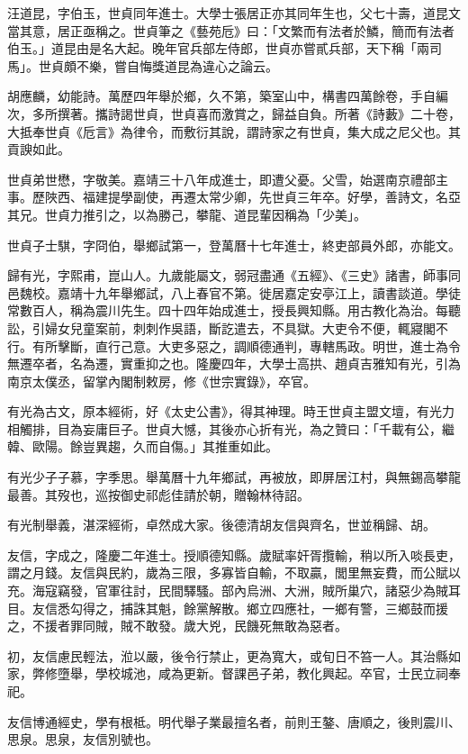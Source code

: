 \begin{pinyinscope}
汪道昆，字伯玉，世貞同年進士。大學士張居正亦其同年生也，父七十壽，道昆文當其意，居正亟稱之。世貞筆之《藝苑卮》曰：「文繁而有法者於鱗，簡而有法者伯玉。」道昆由是名大起。晚年官兵部左侍郎，世貞亦嘗貳兵部，天下稱「兩司馬」。世貞頗不樂，嘗自悔獎道昆為違心之論云。

胡應麟，幼能詩。萬歷四年舉於鄉，久不第，築室山中，構書四萬餘卷，手自編次，多所撰著。攜詩謁世貞，世貞喜而激賞之，歸益自負。所著《詩藪》二十卷，大抵奉世貞《卮言》為律令，而敷衍其說，謂詩家之有世貞，集大成之尼父也。其貢諛如此。

世貞弟世懋，字敬美。嘉靖三十八年成進士，即遭父憂。父雪，始選南京禮部主事。歷陜西、福建提學副使，再遷太常少卿，先世貞三年卒。好學，善詩文，名亞其兄。世貞力推引之，以為勝己，攀龍、道昆輩因稱為「少美」。

世貞子士騏，字冏伯，舉鄉試第一，登萬曆十七年進士，終吏部員外郎，亦能文。

歸有光，字熙甫，崑山人。九歲能屬文，弱冠盡通《五經》、《三史》諸書，師事同邑魏校。嘉靖十九年舉鄉試，八上春官不第。徙居嘉定安亭江上，讀書談道。學徒常數百人，稱為震川先生。四十四年始成進士，授長興知縣。用古教化為治。每聽訟，引婦女兒童案前，刺刺作吳語，斷訖遣去，不具獄。大吏令不便，輒寢閣不行。有所擊斷，直行己意。大吏多惡之，調順德通判，專轄馬政。明世，進士為令無遷卒者，名為遷，實重抑之也。隆慶四年，大學士高拱、趙貞吉雅知有光，引為南京太僕丞，留掌內閣制敕房，修《世宗實錄》，卒官。

有光為古文，原本經術，好《太史公書》，得其神理。時王世貞主盟文壇，有光力相觸排，目為妄庸巨子。世貞大憾，其後亦心折有光，為之贊曰：「千載有公，繼韓、歐陽。餘豈異趨，久而自傷。」其推重如此。

有光少子子慕，字季思。舉萬曆十九年鄉試，再被放，即屏居江村，與無錫高攀龍最善。其歿也，巡按御史祁彪佳請於朝，贈翰林待詔。

有光制舉義，湛深經術，卓然成大家。後德清胡友信與齊名，世並稱歸、胡。

友信，字成之，隆慶二年進士。授順德知縣。歲賦率奸胥攬輸，稍以所入啖長吏，謂之月錢。友信與民約，歲為三限，多寡皆自輸，不取贏，閭里無妄費，而公賦以充。海寇竊發，官軍往討，民間驛騷。部內烏洲、大洲，賊所巢穴，諸惡少為賊耳目。友信悉勾得之，捕誅其魁，餘黨解散。鄉立四應社，一鄉有警，三鄉鼓而援之，不援者罪同賊，賊不敢發。歲大兇，民饑死無敢為惡者。

初，友信慮民輕法，涖以嚴，後令行禁止，更為寬大，或旬日不笞一人。其治縣如家，弊修墮舉，學校城池，咸為更新。督課邑子弟，教化興起。卒官，士民立祠奉祀。

友信博通經史，學有根柢。明代舉子業最擅名者，前則王鏊、唐順之，後則震川、思泉。思泉，友信別號也。


\end{pinyinscope}